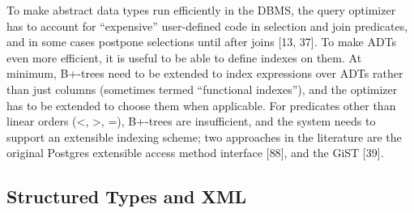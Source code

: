 \documentclass[a4paper,11pt,twoside,openright]{book}
\begin{document}
To make abstract data types run efficiently in the DBMS, the query
optimizer has to account for ``expensive'' user-defined code in
selection and join predicates, and in some cases postpone selections
until after joins {[}13, 37{]}. To make ADTs even more efficient, it is
useful to be able to define indexes on them. At minimum, B+-trees need
to be extended to index expressions over ADTs rather than just columns
(sometimes termed ``functional indexes''), and the optimizer has to be
extended to choose them when applicable. For predicates other than
linear orders (\textless{}, \textgreater{}, =), B+-trees are
insufficient, and the system needs to support an extensible indexing
scheme; two approaches in the literature are the original Postgres
extensible access method interface {[}88{]}, and the GiST {[}39{]}.

\hypertarget{structured-types-and-xml}{%
\subsection{Structured Types and
XML}\label{structured-types-and-xml}}
\end{document}
